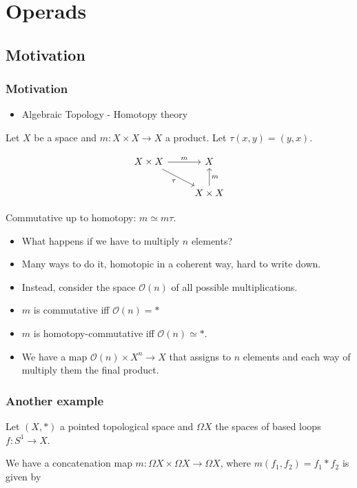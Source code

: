 \documentclass{beamer}
\theoremstyle{definition}
\begin{document}
\section{Operads}

\subsection{Motivation}

\begin{frame}[fragile]
\frametitle{Motivation}
\begin{itemize}
\item<1> Algebraic Topology - Homotopy theory
\end{itemize}\pause
Let $X$ be a space and $m:X\times X\to X$ a product. Let $\tau(x,y)=(y,x)$.\pause

\[
\begin{tikzcd}
X\times X\arrow[r, "m"]\arrow[dr, "\tau"'] & X\\
& X\times X\arrow[u, "m"']
\end{tikzcd}
\]\pause

Commutative up to homotopy: $m\simeq m\tau$.

\end{frame}

\begin{frame}
\begin{itemize}
\item<1-> What happens if we have to multiply $n$ elements? 
\item<2-> Many ways to do it, homotopic in a coherent way, hard to write down.
\item<3-> Instead, consider the space $\mathcal{O}(n)$ of all possible multiplications.
\item<4-> $m$ is commutative iff $\mathcal{O}(n)=*$
\item<5-> $m$ is homotopy-commutative iff $\mathcal{O}(n)\simeq *$.
\item<6-> We have a map $\mathcal{O}(n)\times X^n\to X$ that assigns to $n$ elements and each way of multiply them the final product.
\end{itemize}
\end{frame}


\begin{frame}
\frametitle{Another example}
Let $(X,*)$ a pointed topological space and $\Omega X$ the spaces of based loops $f:S^1\to X$.\pause

We have a concatenation map $m:\Omega X\times \Omega X\to \Omega X$, where $m(f_1,f_2)=f_1*f_2$ is given by\pause

\end{frame}
\end{document}
